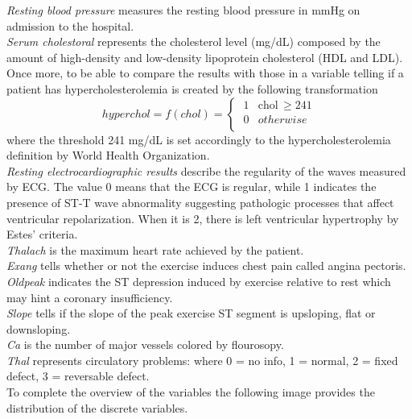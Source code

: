 \documentclass{article}
\begin{document}
\textit{Resting blood pressure} measures the resting blood pressure in mmHg on admission to the hospital. \\
\textit{Serum cholestoral} represents the cholesterol level (mg/dL) composed by the amount of high-density and low-density lipoprotein cholesterol (HDL and LDL). Once more, to be able to compare the results with those in \cite{Steno} a variable telling if a patient has hypercholesterolemia is created by the following transformation
\begin{equation}
   hyperchol =  f(chol) = \begin{cases}
                \; 1 & \text{chol} \, \geq 241 \\
                \; 0 & otherwise \\
                \end{cases}
\end{equation}
where the threshold 241 mg/dL is set accordingly to the hypercholesterolemia definition by World Health Organization. \\
\textit{Resting electrocardiographic results} describe the regularity of the waves measured by ECG. The value 0 means that the ECG is regular, while 1 indicates the presence of ST-T wave abnormality suggesting pathologic processes that affect ventricular repolarization. When it is 2, there is  left ventricular hypertrophy by Estes' criteria. \\
\textit{Thalach} is the maximum heart rate achieved by the patient.\\
\textit{Exang} tells whether or not the exercise induces chest pain called angina pectoris. \\
\textit{Oldpeak} indicates the ST depression induced by exercise relative to rest which may hint a coronary insufficiency.\\
\textit{Slope} tells if the slope of the peak exercise ST segment is upsloping, flat or downsloping. \\
\textit{Ca} is  the number of major vessels colored by flourosopy. \\
\textit{Thal} represents circulatory  problems: where 0 = no info, 1 = normal, 2 = fixed defect, 3 = reversable defect.\\

To complete the overview of the variables the following image provides the distribution of the discrete variables.
\end{document}
